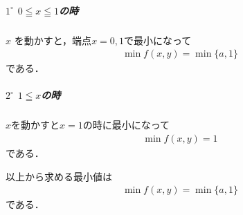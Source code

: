 \documentclass[../../main.tex]{subfiles}
\begin{document}
\subparagraph{$1^{\circ}$ $0 \leqq x \leqq 1$の時}

$x$ を動かすと，端点$x=0,1$で最小になって
\begin{align}
  \min f(x,y) = \min \{a, 1\}
\end{align}
である．

\subparagraph{$2^{\circ}$ $1 \leqq x$の時}

$x$を動かすと$x=1$の時に最小になって
\begin{align}
  \min f(x,y) = 1
\end{align}
である．
\casesend

以上から求める最小値は
\begin{align}
  \min f(x, y) = \min \{a, 1\}
\end{align}
である．
\end{document}
